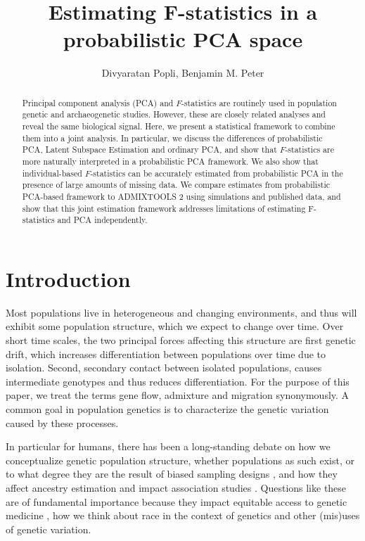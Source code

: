 \documentclass[12pt, letterpaper]{article}
\title{Estimating F-statistics in a probabilistic PCA space}
\author{Divyaratan Popli, Benjamin M. Peter}
\begin{document}
\maketitle


\begin{abstract}

\noindent Principal component analysis (PCA) and $F$-statistics are routinely used in population genetic and archaeogenetic studies. However, these are closely related analyses and reveal the same biological signal. Here, we present a statistical framework to combine them into a joint analysis. In particular, we discuss the differences of probabilistic PCA, Latent Subspace Estimation and ordinary PCA, and show that $F$-statistics are more naturally interpreted in a probabilistic PCA framework. We also show that individual-based $F$-statistics can be accurately estimated from probabilistic PCA in the presence of large amounts of missing data. We compare estimates from probabilistic PCA-based framework to ADMIXTOOLS 2 using simulations and published data, and show that this joint estimation framework addresses limitations of estimating F-statistics and PCA independently.

\end{abstract}

\section{Introduction}
Most populations live in heterogeneous and changing environments, and thus will exhibit some population structure, which we expect to change over time. Over short time scales, the two principal forces affecting this structure are first genetic drift, which increases differentiation between populations over time due to isolation. Second, secondary contact between isolated populations, causes intermediate genotypes and thus reduces differentiation. For the purpose of this paper, we treat the terms gene flow, admixture and migration synonymously. A common goal in population genetics is to characterize the genetic variation caused by these processes.

In particular for humans, there has been a long-standing debate on how we conceptualize genetic population structure, whether populations as such exist, or to what degree they are the result of biased sampling designs \cite{serre_evidence_2004, rosenberg_clines_2005, peter_genetic_2020}, and how they affect ancestry estimation \cite{mathieson_what_2020, simon_contribution_2023} and impact association studies \cite{price_principal_2006}. Questions like these are of fundamental importance because they impact equitable access to genetic medicine \cite{popejoy_genomics_2016}, how we think about race in the context of genetics \cite{lewontin_apportionment_1972, novembre_background_2022} and other (mis)uses of genetic variation.
\end{document}
